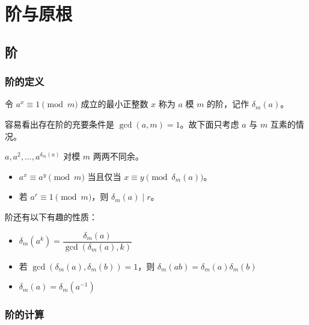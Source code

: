 \documentclass[../main.tex]{subfiles}
\begin{document}
\section{阶与原根}

\subsection{阶}

\subsubsection{阶的定义}

\begin{frame}
\begin{defi}[阶]
令 $a^x\equiv 1\pmod m$ 成立的最小正整数 $x$ 称为 $a$ 模 $m$ 的阶，记作 $\delta_m(a)$。
\end{defi}\pause

容易看出存在阶的充要条件是 $\gcd(a,m)=1$。故下面只考虑 $a$ 与 $m$ 互素的情况。\pause

\begin{theo}
$a,a^2,\dots,a^{\delta_m(a)}$ 对模 $m$ 两两不同余。
\end{theo}\pause

\begin{coro}
\begin{itemize}
\item $a^x\equiv a^y\pmod m$ 当且仅当 $x\equiv y\pmod{\delta_m(a)}$。\pause

\item 若 $a^r\equiv 1\pmod m$，则 $\delta_m(a)\mid r$。
\end{itemize}
\end{coro}
\end{frame}

\begin{frame}
阶还有以下有趣的性质：
\bigskip

\begin{itemize}
\item $\delta_m(a^k)=\dfrac{\delta_m(a)}{\gcd(\delta_m(a),k)}$\pause
\medskip
\item 若 $\gcd(\delta_m(a),\delta_m(b))=1$，则 $\delta_m(ab)=\delta_m(a)\delta_m(b)$\pause
\medskip
\item $\delta_m(a)=\delta_m(a^{-1})$
\end{itemize}
\end{frame}

\subsubsection{阶的计算}
\end{document}
